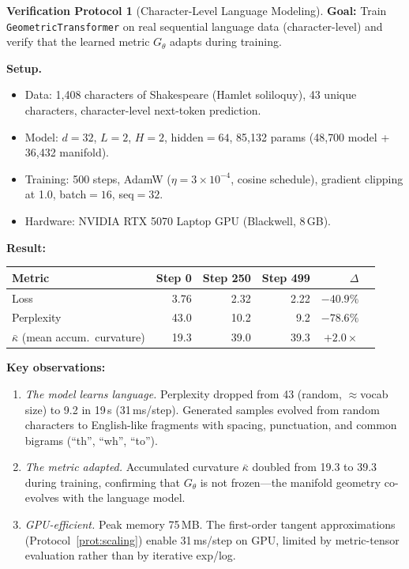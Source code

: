 \documentclass[11pt,a4paper]{article}
\theoremstyle{definition}
\newtheorem{protocol}[theorem]{Verification Protocol}
\theoremstyle{remark}
\begin{document}
\begin{protocol}[Character-Level Language Modeling]\label{prot:char_lm}
\textbf{Goal:} Train \texttt{GeometricTransformer} on real 
sequential language data (character-level) and verify that the 
learned metric $G_\theta$ adapts during training.

\textbf{Setup.}
\begin{itemize}[nosep]
  \item Data: 1{,}408 characters of Shakespeare (Hamlet soliloquy), 
  43 unique characters, character-level next-token prediction.
  \item Model: $d=32$, $L=2$, $H=2$, hidden$=64$, 85{,}132 params 
  (48{,}700 model + 36{,}432 manifold).
  \item Training: 500 steps, AdamW ($\eta = 3\!\times\!10^{-4}$, 
  cosine schedule), gradient clipping at 1.0, batch$=16$, seq$=32$.
  \item Hardware: NVIDIA RTX 5070 Laptop GPU (Blackwell, 8\,GB).
\end{itemize}

\textbf{Result:}
\begin{center}
\begin{tabular}{lrrrrr}
\toprule
Metric & Step 0 & Step 250 & Step 499 & $\Delta$ \\
\midrule
Loss        & 3.76 & 2.32 & 2.22 & $-40.9\%$ \\
Perplexity  & 43.0 & 10.2 & 9.2  & $-78.6\%$ \\
$\bar\kappa$ (mean accum.\ curvature) & 19.3 & 39.0 & 39.3 & $+2.0\times$ \\
\bottomrule
\end{tabular}
\end{center}

\textbf{Key observations:}
\begin{enumerate}[nosep]
  \item \emph{The model learns language.} Perplexity dropped from 
  43 (random, $\approx$vocab size) to 9.2 in 19\,s (31\,ms/step).
  Generated samples evolved from random characters to 
  English-like fragments with spacing, punctuation, and 
  common bigrams (``th'', ``wh'', ``to'').
  \item \emph{The metric adapted.} Accumulated curvature 
  $\bar\kappa$ doubled from 19.3 to 39.3 during training, 
  confirming that $G_\theta$ is not frozen---the manifold 
  geometry co-evolves with the language model.
  \item \emph{GPU-efficient.} Peak memory 75\,MB. The 
  first-order tangent approximations (Protocol~\ref{prot:scaling}) 
  enable 31\,ms/step on GPU, limited by metric-tensor evaluation 
  rather than by iterative exp/log.
\end{enumerate}


\end{protocol}
\end{document}
